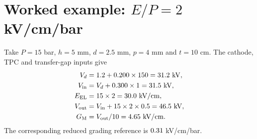 \documentclass[11pt,a4paper]{article}
\newcommand{\num}[2][3]{\pgfmathprintnumber[fixed,precision=#1,fixed zerofill]{#2}}
\newcommand{\gradV}{G_{\mathrm{M}}}
\begin{document}
\section{Worked example: \texorpdfstring{$E/P=2$}{E/P = 2} kV/cm/bar}
Take $P=15$ bar, $h=5$ mm, $d=2.5$ mm, $p=4$ mm and $t=10$ cm.
The cathode, TPC and transfer-gap inputs give
\begin{align}
 V_d &=1.2+0.200\times150=\num[1]{\elmDriftEndKV}\ \mathrm{kV},\\
 V_{\mathrm{in}}&=V_d+0.300\times1=\num[1]{\elmEntryKV}\ \mathrm{kV},\\
 E_{\mathrm{EL}}&=15\times2=\num[1]{\elmELFieldKVcm}\ \mathrm{kV/cm},\\
 V_{\mathrm{out}}&=V_{\mathrm{in}}+15\times2\times0.5
 =\num[1]{\elmExitKV}\ \mathrm{kV},\\
 \gradV&=V_{\mathrm{out}}/10=\num[2]{\elmGradingKVcm}\ \mathrm{kV/cm}.
\end{align}
The corresponding reduced grading reference is
$\num[2]{\elmReducedGrading}$ kV/cm/bar.
\end{document}
